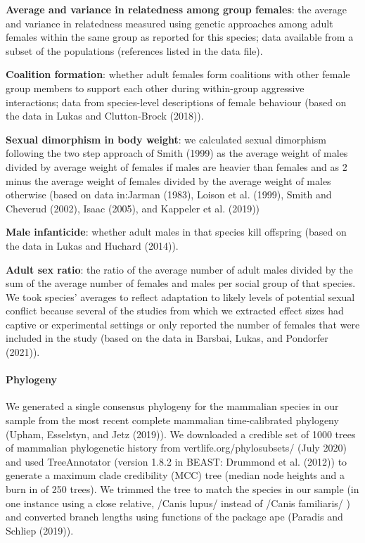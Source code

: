 \documentclass[
]{article}
\begin{document}
\textbf{Average and variance in relatedness among group females}: the
average and variance in relatedness measured using genetic approaches
among adult females within the same group as reported for this species;
data available from a subset of the populations (references listed in
the data file).

\textbf{Coalition formation}: whether adult females form coalitions with
other female group members to support each other during within-group
aggressive interactions; data from species-level descriptions of female
behaviour (based on the data in Lukas and Clutton-Brock (2018)).

\textbf{Sexual dimorphism in body weight}: we calculated sexual
dimorphism following the two step approach of Smith (1999) as the
average weight of males divided by average weight of females if males
are heavier than females and as 2 minus the average weight of females
divided by the average weight of males otherwise (based on data
in:Jarman (1983), Loison et al. (1999), Smith and Cheverud (2002), Isaac
(2005), and Kappeler et al. (2019))

\textbf{Male infanticide}: whether adult males in that species kill
offspring (based on the data in Lukas and Huchard (2014)).

\textbf{Adult sex ratio}: the ratio of the average number of adult males
divided by the sum of the average number of females and males per social
group of that species. We took species' averages to reflect adaptation
to likely levels of potential sexual conflict because several of the
studies from which we extracted effect sizes had captive or experimental
settings or only reported the number of females that were included in
the study (based on the data in Barsbai, Lukas, and Pondorfer (2021)).

\hypertarget{phylogeny}{%
\paragraph{\texorpdfstring{\textbf{Phylogeny}}{Phylogeny}}\label{phylogeny}}

We generated a single consensus phylogeny for the mammalian species in
our sample from the most recent complete mammalian time-calibrated
phylogeny (Upham, Esselstyn, and Jetz (2019)). We downloaded a credible
set of 1000 trees of mammalian phylogenetic history from
vertlife.org/phylosubsets/ (July 2020) and used TreeAnnotator (version
1.8.2 in BEAST: Drummond et al. (2012)) to generate a maximum clade
credibility (MCC) tree (median node heights and a burn in of 250 trees).
We trimmed the tree to match the species in our sample (in one instance
using a close relative, /Canis lupus/ instead of /Canis familiaris/ )
and converted branch lengths using functions of the package ape (Paradis
and Schliep (2019)).
\end{document}

